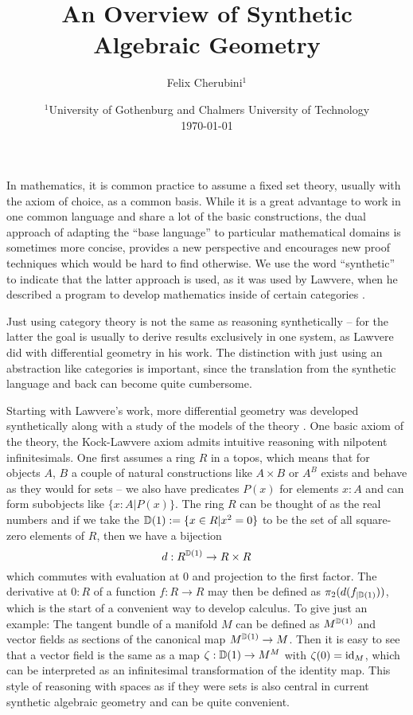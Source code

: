 \documentclass{../util/zariski}
\title{An Overview of Synthetic Algebraic Geometry}
\begin{document}
\author{Felix Cherubini$^1$}
\date{
  $^1$University of Gothenburg and Chalmers University of Technology \\[2ex]%
  \today
}

\maketitle



In mathematics, it is common practice to assume a fixed set theory, usually with the axiom of choice, as a common basis. While it is a great advantage to work in one common language and share a lot of the basic constructions, the dual approach of adapting the  ``base language'' to particular mathematical domains is sometimes more concise, provides a new perspective and encourages new proof techniques which would be hard to find otherwise.
We use the word ``synthetic'' to indicate that the latter approach is used,
as it was used by Lawvere, when he described a program to develop mathematics inside of certain categories \cite{lawvere-categorical-dynamics}.

Just using category theory is not the same as reasoning synthetically -- for the latter the goal is usually to derive results exclusively in one system,
as Lawvere did with differential geometry in his work.
The distinction with just using an abstraction like categories is important, since the translation from the synthetic language and back can become quite cumbersome.

Starting with Lawvere's work, more differential geometry was developed synthetically \cite{kock-sdg} along with a study of the models of the theory \cite{moerdijk-reyes}.
One basic axiom of the theory, the Kock-Lawvere axiom admits intuitive reasoning with nilpotent infinitesimals.
One first assumes a ring $R$ in a topos, which means that for objects $A$, $B$ a couple of natural constructions like $A\times B$ or $A^B$ exists and behave as they would for sets -- we also have predicates $P(x)$ for elements $x:A$ and can form subobjects like $\{x:A\vert P(x)\}$.
The ring $R$ can be thought of as the real numbers and if we take the $\mathbb{D}(1):=\{x\in R\vert x^2=0\}$ to be the set of all square-zero elements of $R$, then we have a bijection
\[ d : R^{\mathbb{D}(1)} \to R \times R \]
which commutes with evaluation at 0 and projection to the first factor.
The derivative at $0:R$ of a function $f : R \to R$ may then be defined as $\pi_2(d(f_{\vert \mathbb{D}(1)}))$, which is the start of a convenient way to develop calculus. To give just an example: The tangent bundle of a manifold $M$ can be defined as $M^{\mathbb{D}(1)}$ and vector fields as sections of the canonical map $M^{\mathbb{D}(1)}\to M$. Then it is easy to see that a vector field is the same as a map $\zeta:\mathbb{D}(1)\to M^M$ with $\zeta(0)=\mathrm{id}_M$, which can be interpreted as an infinitesimal transformation of the identity map. This style of reasoning with spaces as if they were sets is also central in current synthetic algebraic geometry and can be quite convenient. 
\end{document}
